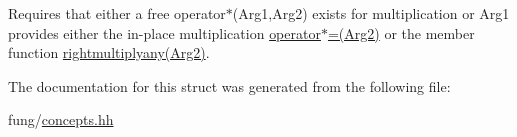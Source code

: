 Requires that either a free operator$\ast$(\-Arg1,\-Arg2) exists for multiplication or Arg1 provides either the in-\/place multiplication \hyperlink{structFunG_1_1Concepts_1_1MultiplicationConcept_ac91bb184ac3641bb86e8cc03497988f4}{operator$\ast$=(\-Arg2)} or the member function \hyperlink{structFunG_1_1Concepts_1_1MultiplicationConcept_aaf1220bf588863cbfe3166f216b8422c}{rightmultiplyany(\-Arg2)}. 

The documentation for this struct was generated from the following file\-:\begin{DoxyCompactItemize}
\item 
fung/\hyperlink{concepts_8hh}{concepts.\-hh}\end{DoxyCompactItemize}

